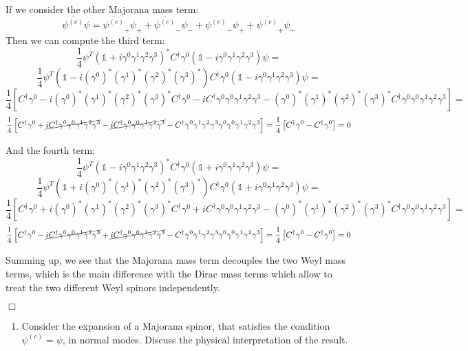 \documentclass[12pt]{article}
\newcommand{\qedwhite}{\hfill \ensuremath{\Box}}
\begin{document}
If we consider the other Majorana mass term:
\[
    \overline{\psi^{(c)} }\psi = \overline{\psi^{(c)}}_+\psi_+ + \overline{\psi^{(c)}}_-\psi_- + \overline{\psi^{(c)}}_-\psi_+ +\overline{\psi^{(c)}}_+\psi_-
\]
Then we can compute the third term:
\[
    \frac{1}{4}\psi^T(\mathbb{1}+i\gamma^0\gamma^1\gamma^2\gamma^3)^*C^\dagger\gamma^0(\mathbb{1}-i\gamma^0\gamma^1\gamma^2\gamma^3) \psi = 
\]
\[
    \frac{1}{4}\psi^T(\mathbb{1}-i(\gamma^0)^*(\gamma^1)^*(\gamma^2)^*(\gamma^3)^*)C^\dagger\gamma^0(\mathbb{1}-i\gamma^0\gamma^1\gamma^2\gamma^3) \psi =
\]
\[
    \frac{1}{4}\left[C^\dagger\gamma^0-i(\gamma^0)^*(\gamma^1)^*(\gamma^2)^*(\gamma^3)^*C^\dagger\gamma^0-iC^\dagger\gamma^0\gamma^0\gamma^1\gamma^2\gamma^3-(\gamma^0)^*(\gamma^1)^*(\gamma^2)^*(\gamma^3)^*C^\dagger\gamma^0\gamma^0\gamma^1\gamma^2\gamma^3\right] = 
\]
\[
    \frac{1}{4}\left[C^\dagger\gamma^0+\cancel{iC^\dagger\gamma^0\gamma^0\gamma^1\gamma^2\gamma^3}-\cancel{iC^\dagger\gamma^0\gamma^0\gamma^1\gamma^2\gamma^3}-C^\dagger\gamma^0\gamma^1\gamma^2\gamma^3\gamma^0\gamma^0\gamma^1\gamma^2\gamma^3\right] = \frac{1}{4}\left[C^\dagger\gamma^0 - C^\dagger\gamma^0\right] = 0
\]

And the fourth term:
\[
    \frac{1}{4}\psi^T(\mathbb{1}-i\gamma^0\gamma^1\gamma^2\gamma^3)^*C^\dagger\gamma^0(\mathbb{1}+i\gamma^0\gamma^1\gamma^2\gamma^3) \psi = 
\]
\[
    \frac{1}{4}\psi^T(\mathbb{1}+i(\gamma^0)^*(\gamma^1)^*(\gamma^2)^*(\gamma^3)^*)C^\dagger\gamma^0(\mathbb{1}+i\gamma^0\gamma^1\gamma^2\gamma^3) \psi =
\]
\[
    \frac{1}{4}\left[C^\dagger\gamma^0+i(\gamma^0)^*(\gamma^1)^*(\gamma^2)^*(\gamma^3)^*C^\dagger\gamma^0+iC^\dagger\gamma^0\gamma^0\gamma^1\gamma^2\gamma^3-(\gamma^0)^*(\gamma^1)^*(\gamma^2)^*(\gamma^3)^*C^\dagger\gamma^0\gamma^0\gamma^1\gamma^2\gamma^3\right] = 
\]
\[
    \frac{1}{4}\left[C^\dagger\gamma^0-\cancel{iC^\dagger\gamma^0\gamma^0\gamma^1\gamma^2\gamma^3}+\cancel{iC^\dagger\gamma^0\gamma^0\gamma^1\gamma^2\gamma^3}-C^\dagger\gamma^0\gamma^1\gamma^2\gamma^3\gamma^0\gamma^0\gamma^1\gamma^2\gamma^3\right] = \frac{1}{4}\left[C^\dagger\gamma^0 - C^\dagger\gamma^0\right] = 0
\]

Summing up, we see that the Majorana mass term decouples the two Weyl mass terms, which is the main difference with the Dirac mass terms which allow to treat the two different Weyl spinors independently.

\qedwhite

\color{black}

\begin{enumerate}[label=(\alph*), start = 3]
    \item Consider the expansion of a Majorana spinor, that satisfies the condition $\psi^{(c)} = \psi$, in normal modes. Discuss the physical interpretation of the result.
\end{enumerate}
\end{document}
